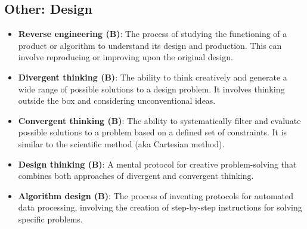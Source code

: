\documentclass{article}
\begin{document}
\subsection*{Other: Design}

\begin{itemize}
    \item \textbf{Reverse engineering (B)}: The process of studying the functioning of a product or algorithm to understand its design and production. This can involve reproducing or improving upon the original design.
    
    \item \textbf{Divergent thinking (B)}: The ability to think creatively and generate a wide range of possible solutions to a design problem. It involves thinking outside the box and considering unconventional ideas.
    
    \item \textbf{Convergent thinking (B)}: The ability to systematically filter and evaluate possible solutions to a problem based on a defined set of constraints. It is similar to the scientific method (aka Cartesian method).
    
    \item \textbf{Design thinking (B)}: A mental protocol for creative problem-solving that combines both approaches of divergent and convergent thinking.
    
    \item \textbf{Algorithm design (B)}: The process of inventing protocols for automated data processing, involving the creation of step-by-step instructions for solving specific problems.
\end{itemize}
\end{document}
